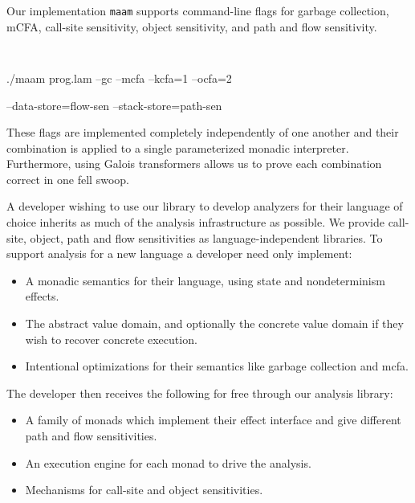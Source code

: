 \par

Our implementation {\tt maam} supports command-line flags for garbage
collection, mCFA, call-site sensitivity, object sensitivity, and path
and flow sensitivity.

{\small\tt
\par \noindent ./maam prog.lam --gc --mcfa --kcfa=1 --ocfa=2
\par \noindent \hspace{2em} --data-store=flow-sen --stack-store=path-sen
}
\par \noindent

These flags are implemented completely independently of one another and
their combination is applied to a single parameterized monadic
interpreter. Furthermore, using Galois transformers allows us to prove
each combination correct in one fell swoop.

\par

A developer wishing to use our library to develop analyzers for their
language of choice inherits as much of the analysis infrastructure as
possible. We provide call-site, object, path and flow sensitivities as
language-independent libraries. To support analysis for a new language a
developer need only implement:

\par

\begin{itemize}
\itemsep1pt\parskip0pt
\item
  A monadic semantics for their language, using state and nondeterminism
  effects.
\item
  The abstract value domain, and optionally the concrete value domain if
  they wish to recover concrete execution.
\item
  Intentional optimizations for their semantics like garbage collection
  and mcfa.
\end{itemize}

\par

The developer then receives the following for free through our analysis
library:

\par

\begin{itemize}
\itemsep1pt\parskip0pt
\item
  A family of monads which implement their effect interface and give
  different path and flow sensitivities.
\item
  An execution engine for each monad to drive the analysis.
\item
  Mechanisms for call-site and object sensitivities.
\end{itemize}

